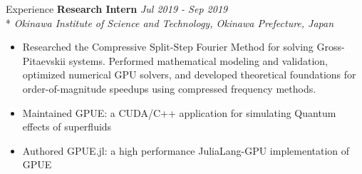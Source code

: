 \documentclass[11pt, letterpaper]{article}
\begin{document}
\begin{section}{Experience}
\textbf{Research Intern}
\hfill
\textit{Jul 2019 - Sep 2019}\\*
\textit{Okinawa Institute of Science and Technology, Okinawa Prefecture, Japan}
\begin{itemize}
  \item Researched the Compressive Split-Step Fourier Method for solving Gross-Pitaevskii systems.
  Performed mathematical modeling and validation, optimized numerical GPU solvers, and developed theoretical foundations for order-of-magnitude speedups using compressed frequency methods.
  \item Maintained GPUE: a CUDA/C++ application for simulating Quantum effects of superfluids
  \item Authored GPUE.jl: a high performance JuliaLang-GPU implementation of GPUE
\end{itemize}

\end{section}

\end{document}

